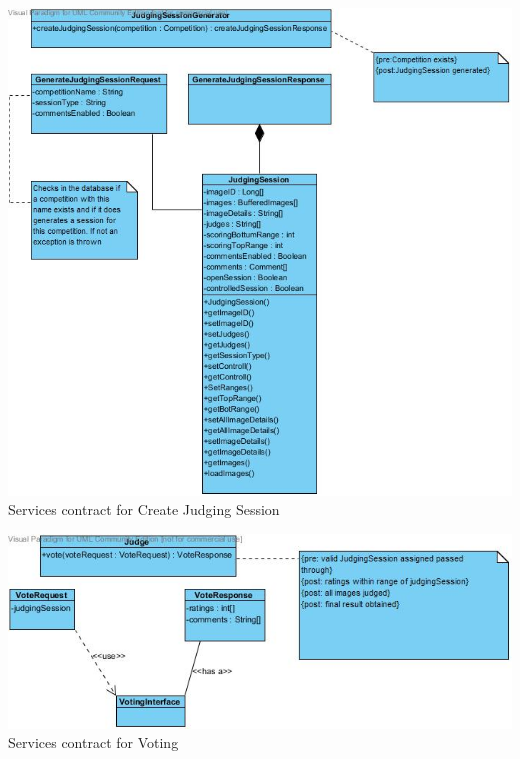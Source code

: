 \documentclass[10pt,a4paper]{article}
\begin{document}
\begin{center}
\advance\leftskip-1.3cm
\includegraphics[width=160mm]{Pictures/servicesContractCreateJudgingSession.jpg} 
Services contract for Create Judging Session
\end{center}

\begin{center}
\advance\leftskip-1.3cm
\includegraphics[width=160mm]{Pictures/servicesContractVote.jpg} 
Services contract for Voting
\end{center}
\end{document}
